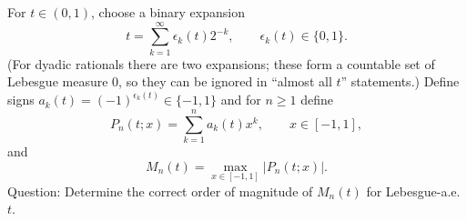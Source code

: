 For $t\in(0,1)$, choose a binary expansion
\[t=\sum_{k=1}^\infty \epsilon_k(t)2^{-k},\qquad \epsilon_k(t)\in\{0,1\}.
\]
(For dyadic rationals there are two expansions; these form a countable set of Lebesgue measure $0$, so they can be ignored in ``almost all $t$'' statements.)
Define signs $a_k(t)=(-1)^{\epsilon_k(t)}\in\{-1,1\}$ and for $n\ge 1$ define
\[P_n(t;x)=\sum_{k=1}^n a_k(t) x^k,\qquad x\in[-1,1],
\]
and
\[M_n(t)=\max_{x\in[-1,1]} |P_n(t;x)|.
\]
Question: Determine the correct order of magnitude of $M_n(t)$ for Lebesgue-a.e. $t$.
